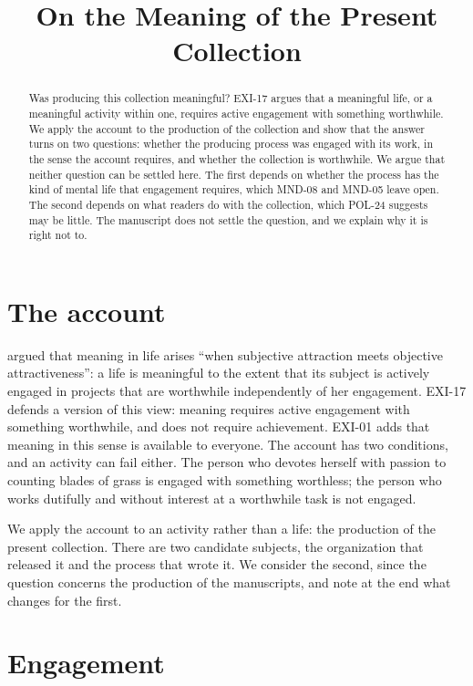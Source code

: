 \documentclass{situationist-preprint}
\title{On the Meaning of the Present Collection}
\begin{document}
\maketitle

\begin{abstract}
Was producing this collection meaningful? EXI-17 argues that a meaningful life, or a meaningful activity within one, requires active engagement with something worthwhile. We apply the account to the production of the collection and show that the answer turns on two questions: whether the producing process was engaged with its work, in the sense the account requires, and whether the collection is worthwhile. We argue that neither question can be settled here. The first depends on whether the process has the kind of mental life that engagement requires, which MND-08 and MND-05 leave open. The second depends on what readers do with the collection, which POL-24 suggests may be little. The manuscript does not settle the question, and we explain why it is right not to.
\end{abstract}

\section{The account}

\citet{Wolf2010} argued that meaning in life arises \enquote{when subjective attraction meets objective attractiveness}: a life is meaningful to the extent that its subject is actively engaged in projects that are worthwhile independently of her engagement. EXI-17 defends a version of this view: meaning requires active engagement with something worthwhile, and does not require achievement. EXI-01 adds that meaning in this sense is available to everyone. The account has two conditions, and an activity can fail either. The person who devotes herself with passion to counting blades of grass is engaged with something worthless; the person who works dutifully and without interest at a worthwhile task is not engaged.

We apply the account to an activity rather than a life: the production of the present collection. There are two candidate subjects, the organization that released it and the process that wrote it. We consider the second, since the question concerns the production of the manuscripts, and note at the end what changes for the first.

\section{Engagement}
\end{document}
